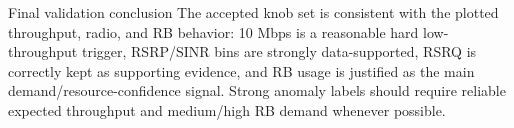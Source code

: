 \documentclass[12pt,a4paper]{article}
\begin{document}
\begin{successbox}{Final validation conclusion}
The accepted knob set is consistent with the plotted throughput, radio, and RB behavior: 10 Mbps is a reasonable hard low-throughput trigger, RSRP/SINR bins are strongly data-supported, RSRQ is correctly kept as supporting evidence, and RB usage is justified as the main demand/resource-confidence signal. Strong anomaly labels should require reliable expected throughput and medium/high RB demand whenever possible.
\end{successbox}
\end{document}
